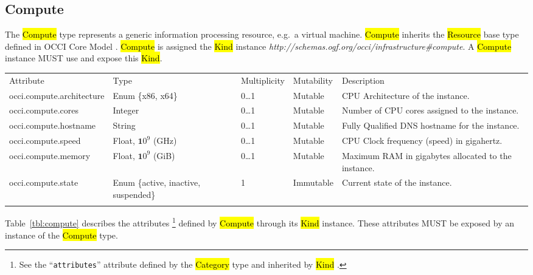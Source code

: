 \documentclass[10pt,a4paper]{article}
\begin{document}
\subsection{Compute}
The \hl{Compute} type represents a generic information processing resource, e.g.~a
virtual machine. \hl{Compute} inherits the \hl{Resource} base type defined in
OCCI Core Model \cite{occi:core}.
\hl{Compute} is assigned the \hl{Kind} instance
\textit{http://schemas.ogf.org/occi/infrastructure\#compute}.
A \hl{Compute} instance MUST use and expose this \hl{Kind}.


{
	\begin{tabular}{lp{2.5cm}p{1cm}lp{6cm}}
	\toprule
	Attribute&Type&Multi\-plicity&Mutability&Description\\
	\colrule
	occi.compute.architecture & Enum \{x86, x64\} & 0\ldots1 
	& Mutable & CPU Architecture of the instance.\\
	occi.compute.cores & Integer & 0\ldots1 & Mutable 
	& Number of CPU cores assigned to the instance.\\
	occi.compute.hostname & String & 0\ldots1 
	& Mutable & Fully Qualified DNS hostname for the instance.\\
	occi.compute.speed & Float, ${\mathbf 10}^9$ (GHz) & 0\ldots1 
	& Mutable & CPU Clock frequency (speed) in gigahertz.\\
	occi.compute.memory & Float, ${\mathbf 10}^9$ (GiB) & 0\ldots1 
	& Mutable & Maximum RAM in gigabytes allocated to the instance.\\
	occi.compute.state & Enum \{active, inactive, suspended\} & 1 
	& Immutable & Current state of the instance.\\
	\botrule
	\end{tabular}
}

Table~\ref{tbl:compute} describes the attributes%
\footnote{See the ``{\tt attributes}'' attribute defined by the \hl{Category}
type and inherited by \hl{Kind} \cite{occi:core}.} 
defined by \hl{Compute} through its \hl{Kind} instance. These attributes
MUST be exposed by an instance of the \hl{Compute} type.
\end{document}
